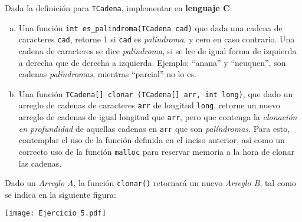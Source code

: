 \documentclass[12pt,a4paper]{article}
\begin{document}
 Dada la definición para \texttt{TCadena}, implementar en \textbf{lenguaje C}:
\begin{enumerate}[a)]
	\item Una función \texttt{int es\_palindroma(TCadena cad)} que dada una cadena de caracteres \texttt{cad}, retorne 1 si \texttt{cad} es \textit{palíndroma}, y cero en caso contrario. Una cadena de caracteres se dice \textit{palíndroma}, si se lee de igual forma de izquierda a derecha que de derecha a izquierda. Ejemplo: ``anana'' y ``neuquen'', son cadenas \textit{palíndromas}, mientras ``parcial'' no lo es.
	\item Una función \texttt{TCadena[] clonar (TCadena[] arr, int long)}, que dado un arreglo de cadenas de caracteres \texttt{arr} de longitud \texttt{long}, retorne un nuevo arreglo de cadenas de igual longitud que \texttt{arr}, pero que contenga la \textit{clonación en profundidad} de aquellas cadenas en \texttt{arr} que son \textit{palíndromas}. Para esto, contemplar el uso de la función definida en el inciso anterior, así como un correcto uso de la función \texttt{malloc} para reservar memoria a la hora de clonar las cadenas.
\end{enumerate}
Dado un \textit{Arreglo A}, la función \texttt{clonar()} retornará un nuevo \textit{Arreglo B}, tal como se indica en la siguiente figura:\\
\begin{centering}
	\texttt{[image: Ejercicio\_5.pdf]} 
\end{centering}
\end{document}
